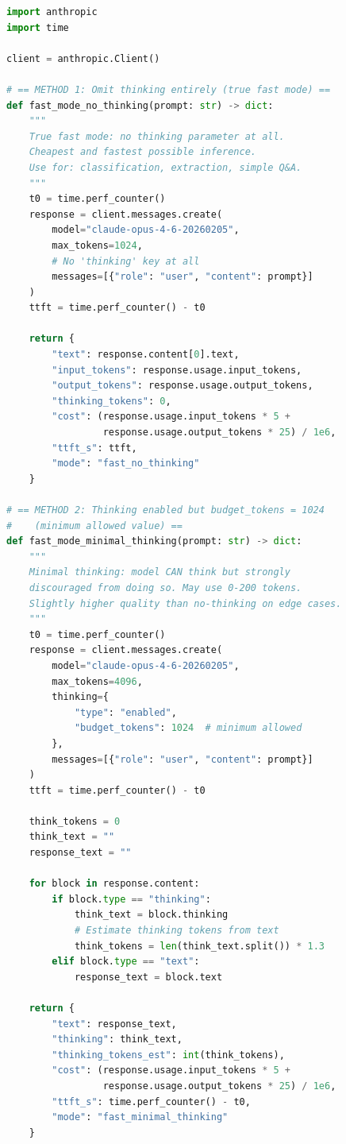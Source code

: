 \documentclass[11pt,a4paper]{article}
\begin{document}
\begin{lstlisting}[language=Python, caption={Fast Mode: Zero Thinking Tokens}]
import anthropic
import time

client = anthropic.Client()

# == METHOD 1: Omit thinking entirely (true fast mode) ==
def fast_mode_no_thinking(prompt: str) -> dict:
    """
    True fast mode: no thinking parameter at all.
    Cheapest and fastest possible inference.
    Use for: classification, extraction, simple Q&A.
    """
    t0 = time.perf_counter()
    response = client.messages.create(
        model="claude-opus-4-6-20260205",
        max_tokens=1024,
        # No 'thinking' key at all
        messages=[{"role": "user", "content": prompt}]
    )
    ttft = time.perf_counter() - t0
    
    return {
        "text": response.content[0].text,
        "input_tokens": response.usage.input_tokens,
        "output_tokens": response.usage.output_tokens,
        "thinking_tokens": 0,
        "cost": (response.usage.input_tokens * 5 + 
                 response.usage.output_tokens * 25) / 1e6,
        "ttft_s": ttft,
        "mode": "fast_no_thinking"
    }

# == METHOD 2: Thinking enabled but budget_tokens = 1024
#    (minimum allowed value) ==
def fast_mode_minimal_thinking(prompt: str) -> dict:
    """
    Minimal thinking: model CAN think but strongly
    discouraged from doing so. May use 0-200 tokens.
    Slightly higher quality than no-thinking on edge cases.
    """
    t0 = time.perf_counter()
    response = client.messages.create(
        model="claude-opus-4-6-20260205",
        max_tokens=4096,
        thinking={
            "type": "enabled",
            "budget_tokens": 1024  # minimum allowed
        },
        messages=[{"role": "user", "content": prompt}]
    )
    ttft = time.perf_counter() - t0
    
    think_tokens = 0
    think_text = ""
    response_text = ""
    
    for block in response.content:
        if block.type == "thinking":
            think_text = block.thinking
            # Estimate thinking tokens from text
            think_tokens = len(think_text.split()) * 1.3
        elif block.type == "text":
            response_text = block.text
    
    return {
        "text": response_text,
        "thinking": think_text,
        "thinking_tokens_est": int(think_tokens),
        "cost": (response.usage.input_tokens * 5 + 
                 response.usage.output_tokens * 25) / 1e6,
        "ttft_s": time.perf_counter() - t0,
        "mode": "fast_minimal_thinking"
    }
\end{lstlisting}
\end{document}
